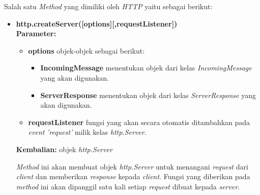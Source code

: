 Salah satu \textit{Method} yang dimiliki oleh \textit{HTTP} yaitu sebagai berikut:
\begin{itemize}
	\item \textbf{http.createServer([options][,requestListener])} \\ \textbf{Parameter:}
	\begin{itemize}
		\item \textbf{options} objek-objek sebagai berikut:
			\begin{itemize}
				\item \textbf{IncomingMessage} menentukan objek dari kelas \textit{IncomingMessage} yang akan digunakan.
				\item \textbf{ServerResponse} menentukan objek dari kelas \textit{ServerResponse} yang akan digunakan.
			\end{itemize}
			
		\item \textbf{requestListener} fungsi yang akan secara otomatis ditambahkan pada \textit{event} \textit{'request'} milik kelas \textit{http.Server}.
	\end{itemize}
	\textbf{Kembalian:} objek \textit{http.Server}
	
	\textit{Method} ini akan membuat objek \textit{http.Server} untuk menangani \textit{request} dari \textit{client} dan memberikan \textit{response} kepada \textit{client}. Fungsi yang diberikan pada \textit{method} ini akan dipanggil satu kali setiap \textit{request} dibuat kepada \textit{server}.
	

\end{itemize}
